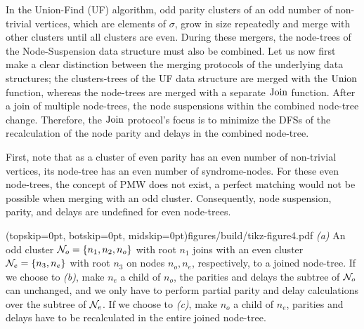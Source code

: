 In the Union-Find (UF) algorithm, odd parity clusters of an odd number of non-trivial vertices, which are elements of $\sigma$, grow in size repeatedly and merge with other clusters until all clusters are even. During these mergers, the node-trees of the Node-Suspension data structure must also be combined. Let us now first make a clear distinction between the merging protocols of the underlying data structures; the clusters-trees of the UF data structure are merged with the $\operatorname{Union}$ function, whereas the node-trees are merged with a separate $\operatorname{Join}$ function. After a join of multiple node-trees, the node suspensions within the combined node-tree change. Therefore, the $\operatorname{Join}$ protocol's focus is to minimize the DFSs of the recalculation of the node parity and delays in the combined node-tree. 

First, note that as a cluster of even parity has an even number of non-trivial vertices, its node-tree has an even number of syndrome-nodes. For these even node-trees, the concept of PMW does not exist, a perfect matching would not be possible when merging with an odd cluster. Consequently, node suspension, parity, and delays are undefined for even node-trees. 

\Figure[hbt](topskip=0pt, botskip=0pt, midskip=0pt){figures/build/tikz-figure4.pdf}{
    \emph{(a)} An odd cluster $\mathcal{N}_o=\{n_1, n_2, n_o\}$ with root $n_1$ joins with an even cluster $\mathcal{N}_e=\{n_3, n_e\}$ with root $n_3$ on nodes $n_o, n_e$, respectively, to a joined node-tree. If we choose to \emph{(b)}, make $n_e$ a child of $n_o$, the parities and delays the subtree of $\mathcal{N}_o$ can unchanged, and we only have to perform partial parity and delay calculations over the subtree of $\mathcal{N}_e$. If we choose to \emph{(c)}, make $n_o$ a child of $n_e$, parities and delays have to be recalculated in the entire joined node-tree. \label{fig4}}

